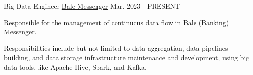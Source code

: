 

\begin{cventries}

  \cventry
    {Big Data Engineer} %
    {\href{https://bale.ai/}{Bale Messenger}} %
    {} %
    {Mar. 2023 - PRESENT} %
    {
      \begin{cvitems} %
        \item {Responsible for the management of continuous data flow in Bale (Banking) Messenger.}
        \item {Responsibilities include but not limited to data aggregation, data pipelines building, and data storage infrastructure maintenance and development, using big data tools, like Apache Hive, Spark, and Kafka.}
      \end{cvitems}
    }



\end{cventries}
